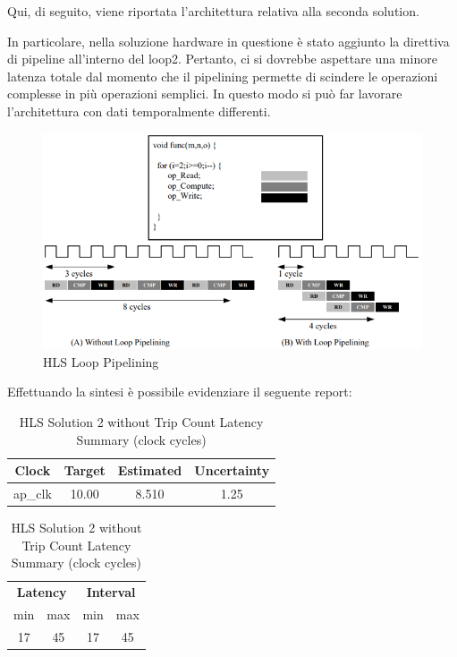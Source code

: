 Qui, di seguito, viene riportata l'architettura relativa alla seconda solution.



In particolare, nella soluzione hardware in questione è stato aggiunto la direttiva di pipeline all'interno del loop2. Pertanto, ci si dovrebbe aspettare una minore latenza totale dal momento che il pipelining permette di scindere le operazioni complesse in più operazioni semplici. In questo modo si può far lavorare l’architettura con dati temporalmente differenti. 

\begin{figure}[H]
	\centering
	\includegraphics[width=1\textwidth]{solutions/s2/looppipelining.png}
	\caption{HLS Loop Pipelining}
\end{figure}

Effettuando la sintesi è possibile evidenziare il seguente report:\\

\begin{table}[H]
	\centering
	\begin{minipage}[t]{0.45\linewidth}
		\centering
		\begin{tabular}{|c|c|c|c|}
			\hline
			\textbf{Clock} & \textbf{Target} & \textbf{Estimated} & \textbf{Uncertainty} \\
			\hline
			ap\_clk & 10.00 & 8.510 & 1.25 \\
			\hline
		\end{tabular}
		\caption{HLS Solution 2 Timing Summary (ns)}
		\label{tab:hls-solution-2-timing-summary}
	\end{minipage}
	\hfill
	\begin{minipage}[t]{0.45\linewidth}
		\centering
		\begin{tabular}{|c|c|c|c|}
			\hline
			\multicolumn{2}{|c|}{\textbf{Latency}} & \multicolumn{2}{|c|}{\textbf{Interval}} \\
			min & max & min & max \\
			\hline
			17 & 45 & 17 & 45 \\
			\hline
		\end{tabular}
		\caption{HLS Solution 2 without Trip Count Latency Summary (clock cycles)}
		\label{tab:hls-solution-2-latency-summary}
	\end{minipage}
\end{table}

